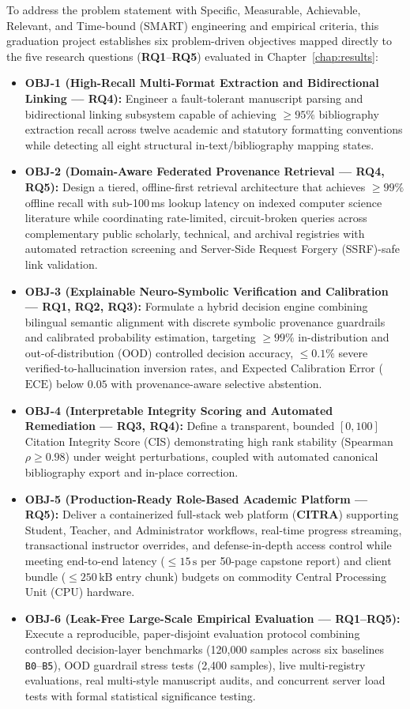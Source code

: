 To address the problem statement with Specific, Measurable, Achievable, Relevant, and Time-bound (SMART) engineering and empirical criteria, this graduation project establishes six problem-driven objectives mapped directly to the five research questions (\textbf{RQ1}--\textbf{RQ5}) evaluated in Chapter~\ref{chap:results}:
\begin{itemize}
    \item \textbf{OBJ-1 (High-Recall Multi-Format Extraction and Bidirectional Linking --- RQ4):} Engineer a fault-tolerant manuscript parsing and bidirectional linking subsystem capable of achieving $\ge 95\%$ bibliography extraction recall across twelve academic and statutory formatting conventions while detecting all eight structural in-text/bibliography mapping states.
    \item \textbf{OBJ-2 (Domain-Aware Federated Provenance Retrieval --- RQ4, RQ5):} Design a tiered, offline-first retrieval architecture that achieves $\ge 99\%$ offline recall with sub-100\,ms lookup latency on indexed computer science literature while coordinating rate-limited, circuit-broken queries across complementary public scholarly, technical, and archival registries with automated retraction screening and Server-Side Request Forgery (SSRF)-safe link validation.
    \item \textbf{OBJ-3 (Explainable Neuro-Symbolic Verification and Calibration --- RQ1, RQ2, RQ3):} Formulate a hybrid decision engine combining bilingual semantic alignment with discrete symbolic provenance guardrails and calibrated probability estimation, targeting $\ge 99\%$ in-distribution and out-of-distribution (OOD) controlled decision accuracy, $\le 0.1\%$ severe verified-to-hallucination inversion rates, and Expected Calibration Error ($\text{ECE}$) below $0.05$ with provenance-aware selective abstention.
    \item \textbf{OBJ-4 (Interpretable Integrity Scoring and Automated Remediation --- RQ3, RQ4):} Define a transparent, bounded $[0, 100]$ Citation Integrity Score (CIS) demonstrating high rank stability (Spearman $\rho \ge 0.98$) under weight perturbations, coupled with automated canonical bibliography export and in-place correction.
    \item \textbf{OBJ-5 (Production-Ready Role-Based Academic Platform --- RQ5):} Deliver a containerized full-stack web platform (\textbf{CITRA}) supporting Student, Teacher, and Administrator workflows, real-time progress streaming, transactional instructor overrides, and defense-in-depth access control while meeting end-to-end latency ($\le 15\,\text{s}$ per 50-page capstone report) and client bundle ($\le 250\,\text{kB}$ entry chunk) budgets on commodity Central Processing Unit (CPU) hardware.
    \item \textbf{OBJ-6 (Leak-Free Large-Scale Empirical Evaluation --- RQ1--RQ5):} Execute a reproducible, paper-disjoint evaluation protocol combining controlled decision-layer benchmarks (120,000 samples across six baselines \texttt{B0}--\texttt{B5}), OOD guardrail stress tests (2,400 samples), live multi-registry evaluations, real multi-style manuscript audits, and concurrent server load tests with formal statistical significance testing.
\end{itemize}

